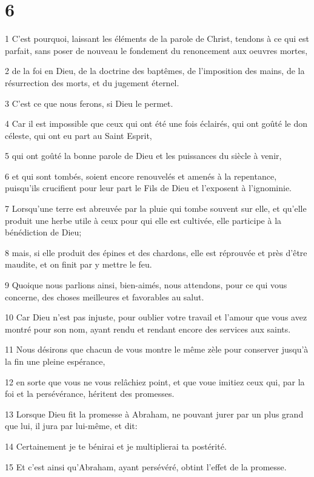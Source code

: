 \chapter{6}

\par 1 C'est pourquoi, laissant les éléments de la parole de Christ, tendons à ce qui est parfait, sans poser de nouveau le fondement du renoncement aux oeuvres mortes,
\par 2 de la foi en Dieu, de la doctrine des baptêmes, de l'imposition des mains, de la résurrection des morts, et du jugement éternel.
\par 3 C'est ce que nous ferons, si Dieu le permet.
\par 4 Car il est impossible que ceux qui ont été une fois éclairés, qui ont goûté le don céleste, qui ont eu part au Saint Esprit,
\par 5 qui ont goûté la bonne parole de Dieu et les puissances du siècle à venir,
\par 6 et qui sont tombés, soient encore renouvelés et amenés à la repentance, puisqu'ils crucifient pour leur part le Fils de Dieu et l'exposent à l'ignominie.
\par 7 Lorsqu'une terre est abreuvée par la pluie qui tombe souvent sur elle, et qu'elle produit une herbe utile à ceux pour qui elle est cultivée, elle participe à la bénédiction de Dieu;
\par 8 mais, si elle produit des épines et des chardons, elle est réprouvée et près d'être maudite, et on finit par y mettre le feu.
\par 9 Quoique nous parlions ainsi, bien-aimés, nous attendons, pour ce qui vous concerne, des choses meilleures et favorables au salut.
\par 10 Car Dieu n'est pas injuste, pour oublier votre travail et l'amour que vous avez montré pour son nom, ayant rendu et rendant encore des services aux saints.
\par 11 Nous désirons que chacun de vous montre le même zèle pour conserver jusqu'à la fin une pleine espérance,
\par 12 en sorte que vous ne vous relâchiez point, et que voue imitiez ceux qui, par la foi et la persévérance, héritent des promesses.
\par 13 Lorsque Dieu fit la promesse à Abraham, ne pouvant jurer par un plus grand que lui, il jura par lui-même, et dit:
\par 14 Certainement je te bénirai et je multiplierai ta postérité.
\par 15 Et c'est ainsi qu'Abraham, ayant persévéré, obtint l'effet de la promesse.
